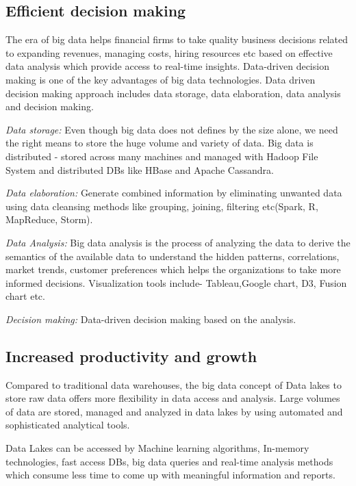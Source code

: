 \documentclass[sigconf]{acmart}
\begin{document}
\subsection{Efficient decision making}

The era of big data helps financial firms to take quality business decisions related to expanding revenues, managing costs, hiring resources etc based on effective data analysis which provide access to real-time insights.  Data-driven decision making is one of the key advantages of big data technologies. Data driven decision making approach includes data storage, data elaboration, data analysis and decision making. 

\textit{Data storage:} Even though big data does not defines by the size alone, we need the right means to store the huge volume and variety of data. Big data is distributed - stored across many machines and managed with Hadoop File System and distributed DBs like HBase and Apache Cassandra.

\textit{Data elaboration:} Generate combined information by eliminating unwanted data using data cleansing methods like grouping, joining, filtering etc(Spark, R, MapReduce, Storm). 

\textit{Data Analysis:} Big data analysis is the process of analyzing the data to derive the semantics of the available data to understand the hidden patterns, correlations, market trends, customer preferences which helps the organizations to take more informed decisions. Visualization tools include- Tableau,Google chart, D3, Fusion chart etc.

\textit{Decision making:} Data-driven decision making based on the analysis.

\subsection{Increased productivity and growth}
Compared to traditional data warehouses, the big data concept of Data lakes to store raw data offers more flexibility in data access and analysis. Large volumes of data are stored, managed and analyzed in data lakes  by using automated and sophisticated analytical tools. 

Data Lakes can be accessed by Machine learning algorithms, In-memory technologies, fast access DBs, big data queries and real-time analysis methods which consume less time to come up with meaningful information and reports.
\end{document}
